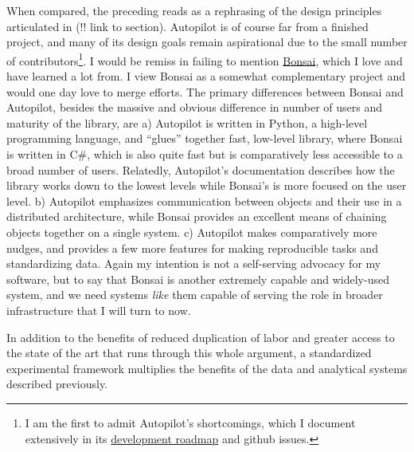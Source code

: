 \documentclass[11pt]{article}
\begin{document}
\begin{multicols}{2}
When compared, the preceding reads as a rephrasing of the design
principles articulated in (!! link to section). Autopilot is of course
far from a finished project, and many of its design goals remain
aspirational due to the small number of contributors\footnote{I am the
  first to admit Autopilot's shortcomings, which I document extensively
  in its
  \href{https://docs.auto-pi-lot.com/en/latest/todo.html}{development
  roadmap} and github issues.}. I would be remiss in failing to mention
\href{https://bonsai-rx.org/}{Bonsai}, which I love and have learned a
lot from. I view Bonsai as a somewhat complementary project and would
one day love to merge efforts. The primary differences between Bonsai
and Autopilot, besides the massive and obvious difference in number of
users and maturity of the library, are a) Autopilot is written in
Python, a high-level programming language, and ``glues'' together fast,
low-level library, where Bonsai is written in C\#, which is also quite
fast but is comparatively less accessible to a broad number of users.
Relatedly, Autopilot's documentation describes how the library works
down to the lowest levels while Bonsai's is more focused on the user
level. b) Autopilot emphasizes communication between objects and their
use in a distributed architecture, while Bonsai provides an excellent
means of chaining objects together on a single system. c) Autopilot
makes comparatively more nudges, and provides a few more features for
making reproducible tasks and standardizing data. Again my intention is
not a self-serving advocacy for my software, but to say that Bonsai is
another extremely capable and widely-used system, and we need systems
\emph{like} them capable of serving the role in broader infrastructure
that I will turn to now.

In addition to the benefits of reduced duplication of labor and greater
access to the state of the art that runs through this whole argument, a
standardized experimental framework multiplies the benefits of the data
and analytical systems described previously.


\end{multicols}
\end{document}
